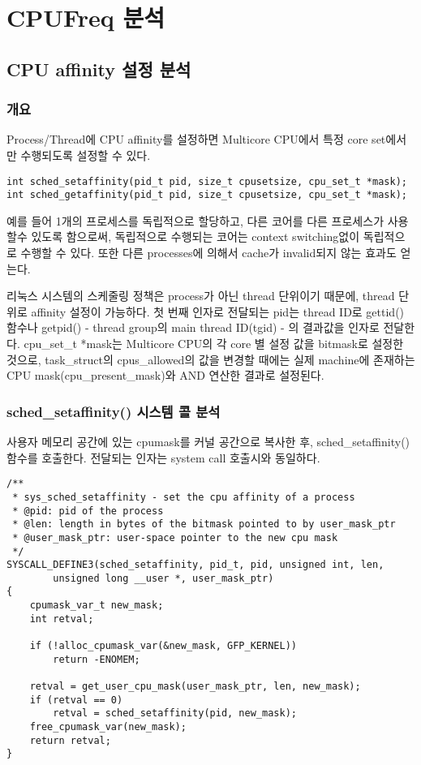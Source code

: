 \section{CPUFreq 분석}

\subsection{CPU affinity 설정 분석}

\subsubsection{개요}
Process/Thread에 CPU affinity를 설정하면 Multicore CPU에서 특정 core set에서만 수행되도록 설정할 수 있다. 

\begin{lstlisting}
int sched_setaffinity(pid_t pid, size_t cpusetsize, cpu_set_t *mask);
int sched_getaffinity(pid_t pid, size_t cpusetsize, cpu_set_t *mask);
\end{lstlisting}

예를 들어 1개의 프로세스를 독립적으로 할당하고, 다른 코어를 다른 프로세스가 사용할수 있도록 함으로써, 
독립적으로 수행되는 코어는 context switching없이 독립적으로 수행할 수 있다. 
또한 다른 processes에 의해서 cache가 invalid되지 않는 효과도 얻는다. 

리눅스 시스템의 스케줄링 정책은 process가 아닌 thread 단위이기 때문에, thread 단위로 affinity 설정이 가능하다. 
첫 번째 인자로 전달되는 pid는 thread ID로 gettid() 함수나 getpid() - thread group의 main thread ID(tgid) - 의 결과값을 인자로 전달한다. 
cpu\_set\_t *mask는 Multicore CPU의 각 core 별 설정 값을 bitmask로 설정한 것으로, 
task\_struct의 cpus\_allowed의 값을 변경할 때에는 실제 machine에 존재하는 CPU mask(cpu\_present\_mask)와 AND 연산한 결과로 설정된다. 

\subsubsection{sched\_setaffinity() 시스템 콜 분석}
사용자 메모리 공간에 있는 cpumask를 커널 공간으로 복사한 후, sched\_setaffinity() 함수를 호출한다. 
전달되는 인자는 system call 호출시와 동일하다. 
\begin{lstlisting}
/**
 * sys_sched_setaffinity - set the cpu affinity of a process
 * @pid: pid of the process
 * @len: length in bytes of the bitmask pointed to by user_mask_ptr
 * @user_mask_ptr: user-space pointer to the new cpu mask
 */
SYSCALL_DEFINE3(sched_setaffinity, pid_t, pid, unsigned int, len,
        unsigned long __user *, user_mask_ptr)
{
    cpumask_var_t new_mask;
    int retval;

    if (!alloc_cpumask_var(&new_mask, GFP_KERNEL))
        return -ENOMEM;

    retval = get_user_cpu_mask(user_mask_ptr, len, new_mask);
    if (retval == 0)
        retval = sched_setaffinity(pid, new_mask);
    free_cpumask_var(new_mask);
    return retval;
}
\end{lstlisting}

